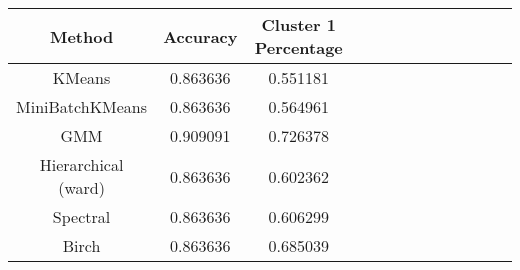 \begin{tabular}{ccccccccccccc}
\toprule
             Method &  Accuracy &  Cluster 1 Percentage \\
\midrule
             KMeans &  0.863636 &              0.551181 \\
    MiniBatchKMeans &  0.863636 &              0.564961 \\
                GMM &  0.909091 &              0.726378 \\
Hierarchical (ward) &  0.863636 &              0.602362 \\
           Spectral &  0.863636 &              0.606299 \\
              Birch &  0.863636 &              0.685039 \\
\bottomrule
\end{tabular}
